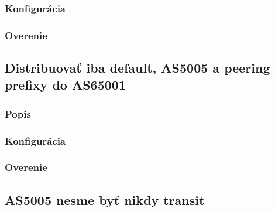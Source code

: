 \documentclass[12pt,twoside,a4paper]{report}
\begin{document}
\subsubsection{Konfigurácia}
\paragraph{}

\subsubsection{Overenie}
\paragraph{}







\subsection{Distribuovať iba default, AS5005 a peering prefixy do AS65001}
\subsubsection{Popis}
\paragraph{}

\subsubsection{Konfigurácia}
\paragraph{}

\subsubsection{Overenie}
\paragraph{}







\subsection{AS5005 nesme byť nikdy transit}
\end{document}
